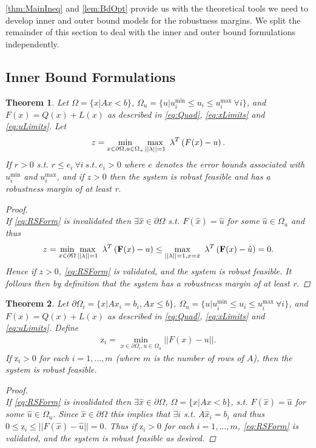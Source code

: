 \documentclass[11pt]{article}
\theoremstyle{plain}
\newtheorem{thm}{Theorem}[section]
\theoremstyle{definition}
\theoremstyle{remark}
\begin{document}
\cref{thm:MainIneq} and \cref{lem:BdOpt} provide us with the theoretical tools we need to develop inner and outer bound models for the robustness margins. We split the remainder of this section to deal with the inner and outer bound formulations independently. 


\subsection{Inner Bound Formulations}

\begin{thm}
Let $\Omega=\{x| Ax< b\}$, $\Omega_{u}=\{u| u^{\min}_i\leq u_i \leq u^{\max}_i \ \forall i \}$, and $F(x)=Q(x)+L(x)$ as described in \eqref{eq:Quad}, \eqref{eq:xLimits} and \eqref{eq:uLimits}. Let
$$z = \min\limits_{x\in \partial \Omega, u\in \Omega_{u} }\max\limits_{||\bold{\lambda}||=1}\ \bold{\lambda}^T\left(F(x)-u\right).$$
If $r>0$ s.t. $r\leq e_i \ \forall i \ s.t. \ e_i>0$ where $e$ denotes the error bounds associated with $ u^{\min}_i$ and $ u^{\max}_i$, and if $z>0$ then the system is robust feasible and has a robustness margin of at least r.

\begin{proof} \ \\
If \eqref{eq:RSForm} is invalidated then $\exists \hat{x}\in\partial\Omega$ s.t. $F(\hat{x})=\hat{u}$ for some $\hat{u}\in\Omega_{u}$ and thus $$z = \min\limits_{x\in \partial \Omega}\max\limits_{||\bold{\lambda}||=1}\ \bold{\lambda}^T\left(\bold{F}(x)-u\right)\leq \max\limits_{||\bold{\lambda}||=1, x=\hat{x}}\ \bold{\lambda}^T\left(\bold{F}(x)-\hat{u}\right)=0.$$ 
Hence if $z>0$, \eqref{eq:RSForm} is validated, and the system is robust feasible. It follows then by definition that the system has a robustness margin of at least r.
\end{proof}
\end{thm}



\begin{thm} \label{thm:RobFeas}
Let $\partial\Omega_i=\{x| Ax_i = b_i, Ax\leq b\}$, $\Omega_{u}=\{u| u^{\min}_i\leq u_i \leq u^{\max}_i \ \forall i \}$, and $F(x)=Q(x)+L(x)$ as described in \eqref{eq:Quad}, \eqref{eq:xLimits} and \eqref{eq:uLimits}. Define
\begin{align}
\mathrm{z}_i =  \min_{x\in\partial\Omega_i, u\in \Omega_u} ||F(x)-u||. \label{eq:OPTfeas}
\end{align}
If $\mathrm{z}_i>0$ for each $i = 1, \ldots, m$ (where $m$ is the number of rows of $A$), then the system is robust feasible.

\begin{proof} \ \\
If \eqref{eq:RSForm} is invalidated then $\exists \hat{x}\in\partial\Omega$, $\Omega=\{x| Ax< b\}$, s.t. $F(\hat{x})=\hat{u}$ for some $\hat{u}\in \Omega_u$. Since $\hat{x}\in\partial\Omega$ this implies that $\exists i$ s.t. $A\hat{x}_i=b_i$ and thus $0\leq \mathrm{z}_i \leq ||F(\hat{x})-\hat{u}||=0$. Thus if $\mathrm{z}_i>0$ for each $i = 1, \ldots, m$, \eqref{eq:RSForm} is validated, and the system is robust feasible as desired.
\end{proof}
\end{thm}
\end{document}

